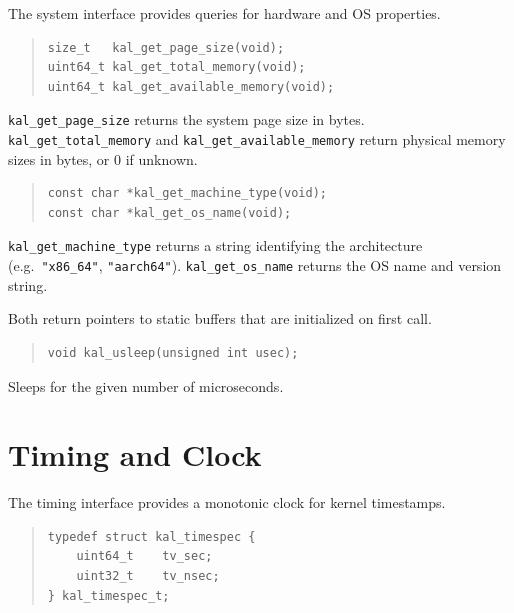 \documentclass[11pt,twoside]{article}
\begin{document}
The system interface provides queries for hardware and OS properties.

\begin{quote}
\begin{verbatim}
size_t   kal_get_page_size(void);
uint64_t kal_get_total_memory(void);
uint64_t kal_get_available_memory(void);
\end{verbatim}
\end{quote}

{\tt kal\_get\_page\_size} returns the system page size in bytes.
{\tt kal\_get\_total\_memory} and {\tt kal\_get\_available\_memory}
return physical memory sizes in bytes, or $0$ if unknown.

\begin{quote}
\begin{verbatim}
const char *kal_get_machine_type(void);
const char *kal_get_os_name(void);
\end{verbatim}
\end{quote}

{\tt kal\_get\_machine\_type} returns a string identifying the
architecture (e.g.\ {\tt "x86\_64"}, {\tt "aarch64"}).
{\tt kal\_get\_os\_name} returns the OS name and version string.

Both return pointers to static buffers that are initialized on first
call.

\begin{quote}
\begin{verbatim}
void kal_usleep(unsigned int usec);
\end{verbatim}
\end{quote}

Sleeps for the given number of microseconds.

\newpage
\section{Timing and Clock}
\label{sec:time}

The timing interface provides a monotonic clock for kernel
timestamps.

\begin{quote}
\begin{verbatim}
typedef struct kal_timespec {
    uint64_t    tv_sec;
    uint32_t    tv_nsec;
} kal_timespec_t;
\end{verbatim}
\end{quote}
\end{document}
